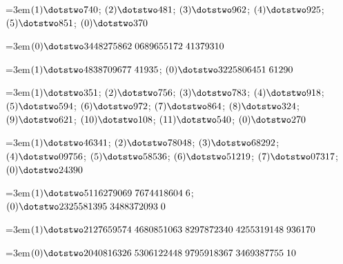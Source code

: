 \par\noindent\hangindent=3em\enspace $(1)\dotstwo740$; $(2)\dotstwo481$; $(3)\dotstwo962$; $(4)\dotstwo925$; $(5)\dotstwo851$; $(0)\dotstwo370$\par\smallskip

\par\noindent\hangindent=3em\enspace $(0)\dotstwo3448275862\;\allowbreak 0689655172\;\allowbreak 41379310$\par\smallskip

\par\noindent\hangindent=3em\enspace $(1)\dotstwo4838709677\;\allowbreak 41935$; $(0)\dotstwo3225806451\;\allowbreak 61290$\par\smallskip

\par\noindent\hangindent=3em\enspace $(1)\dotstwo351$; $(2)\dotstwo756$; $(3)\dotstwo783$; $(4)\dotstwo918$; $(5)\dotstwo594$; $(6)\dotstwo972$; $(7)\dotstwo864$; $(8)\dotstwo324$; $(9)\dotstwo621$; $(10)\dotstwo108$; $(11)\dotstwo540$; $(0)\dotstwo270$\par\smallskip

\par\noindent\hangindent=3em\enspace $(1)\dotstwo46341$; $(2)\dotstwo78048$; $(3)\dotstwo68292$; $(4)\dotstwo09756$; $(5)\dotstwo58536$; $(6)\dotstwo51219$; $(7)\dotstwo07317$; $(0)\dotstwo24390$\par\smallskip

\par\noindent\hangindent=3em\enspace $(1)\dotstwo5116279069\;\allowbreak 7674418604\;\allowbreak 6$; $(0)\dotstwo2325581395\;\allowbreak 3488372093\;\allowbreak 0$\par\smallskip

\par\noindent\hangindent=3em\enspace $(1)\dotstwo2127659574\;\allowbreak 4680851063\;\allowbreak 8297872340\;\allowbreak 4255319148\;\allowbreak 936170$\par\smallskip

\par\noindent\hangindent=3em\enspace $(0)\dotstwo2040816326\;\allowbreak 5306122448\;\allowbreak 9795918367\;\allowbreak 3469387755\;\allowbreak 10$\par\smallskip

